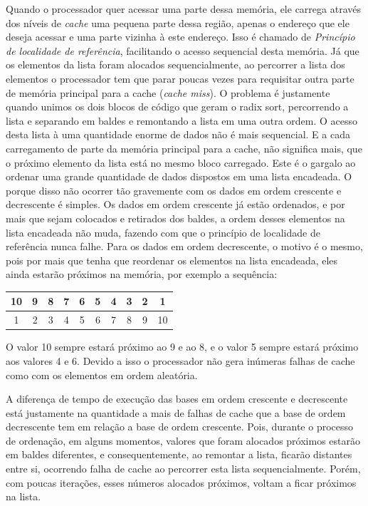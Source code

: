 \documentclass[fleqn,10pt]{SelfArx} %
\begin{document}
Quando o processador quer acessar uma parte dessa memória, ele carrega através dos níveis de \emph{cache} 
uma pequena parte dessa região, apenas o endereço que ele deseja acessar e uma parte vizinha à este endereço. Isso 
é chamado de \emph{Princípio de localidade de referência}, facilitando o acesso sequencial desta memória. Já que 
os elementos da lista foram alocados sequencialmente, ao percorrer a lista dos elementos o processador tem 
que parar poucas vezes para requisitar outra parte de memória principal para a cache (\emph{cache miss}). O problema é justamente quando 
unimos os dois blocos de código que geram o radix sort, percorrendo a lista e separando em baldes e remontando a 
lista em uma outra ordem. O acesso desta lista à uma quantidade enorme de dados não é mais sequencial. E a cada 
carregamento de parte da memória principal para a cache, não significa mais, que o próximo elemento da lista está 
no mesmo bloco carregado. Este é o gargalo ao ordenar uma grande quantidade de dados dispostos em uma lista encadeada.
O porque disso não ocorrer tão gravemente com os dados em ordem crescente e decrescente é simples. Os dados 
em ordem crescente já estão ordenados, e por mais que sejam colocados e retirados dos baldes, a ordem desses elementos 
na lista encadeada não muda, fazendo com que o princípio de localidade de referência nunca falhe. Para os dados 
em ordem decrescente, o motivo é o mesmo, pois por mais que tenha que reordenar os elementos na lista encadeada, eles 
ainda estarão próximos na memória, por exemplo a sequência:

\setlength\doublerulesep{0.2cm} 
\begin{center}
  \begin{tabular}{|cccccccccc|}
    \hline
     10 & 9 & 8 & 7 & 6 & 5 & 4 & 3 & 2 & 1 \\  \hline \hline
     1 & 2 & 3 & 4 & 5 & 6 & 7 & 8 & 9 & 10 \\  
    \hline
  \end{tabular}
\end{center}

O valor 10 sempre estará próximo ao 9 e ao 8, e o valor 5 sempre estará próximo aos valores 4 e 6. Devido a isso 
o processador não gera inúmeras falhas de cache como com os elementos em ordem aleatória. 

A diferença de tempo de 
execução das bases em ordem crescente e decrescente está justamente na quantidade a mais de falhas de cache que 
a base de ordem decrescente tem em relação a base de ordem crescente. Pois, durante o processo de ordenação, 
em alguns momentos, valores que foram alocados próximos estarão em baldes diferentes, e consequentemente, ao remontar 
a lista, ficarão distantes entre si, ocorrendo falha de cache ao percorrer esta lista sequencialmente. Porém, com 
poucas iterações, esses números alocados próximos, voltam a ficar próximos na lista.
\end{document}
